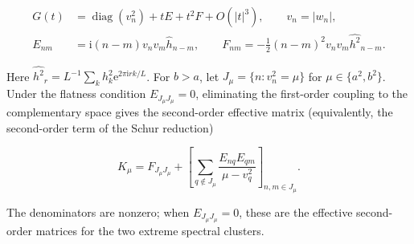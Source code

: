 \documentclass[10pt,twoside,final]{siamart1116}
\numberwithin{equation}{section}
\numberwithin{theorem}{section}
\newcommand{\diag}{\operatorname{diag}}
\newcommand{\e}{\mathrm e}
\newcommand{\ii}{\mathrm i}
\begin{document}
\begin{equation}\label{eq:gram-second}
\begin{split}
G(t)&=\diag(v_n^2)+tE+t^2F+O(|t|^3),\qquad v_n=|w_n|,\\
E_{nm}&=\ii(n-m)v_nv_m\widehat h_{n-m},\qquad
F_{nm}=-\tfrac12(n-m)^2v_nv_m\widehat{h^2}_{n-m}.
\end{split}
\end{equation}

Here $\widehat{h^2}_r=L^{-1}\sum_k h_k^2\e^{2\pi\ii rk/L}$.
For $b>a$, let $J_\mu=\{n:v_n^2=\mu\}$ for $\mu\in\{a^2,b^2\}$.
Under the flatness condition $E_{J_\mu J_\mu}=0$, eliminating the first-order
coupling to the complementary space gives the second-order effective matrix
(equivalently, the second-order term of the Schur reduction)

\begin{equation}\label{eq:effective-second}
K_\mu=F_{J_\mu J_\mu}+
\left[\sum_{q\notin J_\mu}\frac{E_{nq}E_{qm}}{\mu-v_q^2}\right]_{n,m\in J_\mu}.
\end{equation}

The denominators are nonzero; when $E_{J_\mu J_\mu}=0$, these are the
effective second-order matrices for the two extreme spectral clusters.
\end{document}
